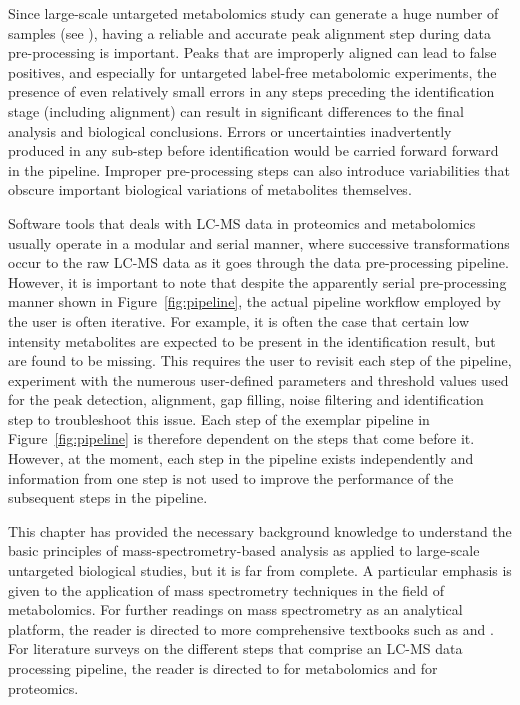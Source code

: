 Since large-scale untargeted metabolomics study can generate a huge number of samples (see \cite{DeVos2007a,Creek2011}), having a reliable and accurate peak alignment step during data pre-processing is important. Peaks that are improperly aligned can lead to false positives, and especially for untargeted label-free metabolomic experiments, the presence of even relatively small errors in any steps preceding the identification stage (including alignment) can result in significant differences to the final analysis and biological conclusions. Errors or uncertainties inadvertently produced in any sub-step before identification would be carried forward forward in the pipeline. Improper pre-processing steps can also introduce variabilities that obscure important biological variations of metabolites themselves. 

Software tools that deals with LC-MS data in proteomics and metabolomics usually operate in a modular and serial manner, where successive transformations occur to the raw LC-MS data as it goes through the data pre-processing pipeline. However, it is important to note that despite the  apparently serial pre-processing manner shown in Figure~\ref{fig:pipeline}, the actual pipeline workflow employed by the user is often iterative. For example, it is often the case that certain low intensity metabolites are expected to be present in the identification result, but are found to be missing. This requires the user to revisit each step of the pipeline, experiment with the numerous user-defined parameters and threshold values used for the peak detection, alignment, gap filling, noise filtering and identification step to troubleshoot this issue. Each step of the exemplar pipeline in Figure~\ref{fig:pipeline} is therefore dependent on the steps that come before it. However, at the moment, each step in the pipeline exists independently and information from one step is not used to improve the performance of the subsequent steps in the pipeline. 

This chapter has provided the necessary background knowledge to understand the basic principles of mass-spectrometry-based analysis as applied to large-scale untargeted biological studies, but it is far from complete. A particular emphasis is given to the application of mass spectrometry techniques in the field of metabolomics. For further readings on mass spectrometry as an analytical platform, the reader is directed to more comprehensive textbooks such as \cite{Hoffmann2007} and \cite{gross2006mass}. For literature surveys on the different steps that comprise an LC-MS data processing pipeline, the reader is directed to \cite{Castillo2011,Smith2014,Gika2014,Alonso2015} for metabolomics and \cite{Sandin2014, Megger2013, Smith2014} for proteomics. 